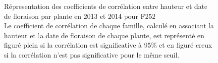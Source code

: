 \documentclass[12pt,a4paper]{article}
\begin{document}
			 				\begin{figure} [!h]
			 					\caption{Répresentation des coefficients de corrélation entre hauteur et date de floraison par plante en 2013 et 2014 pour F252\\
			 					Le coefficient de corrélation de chaque famille, calculé en associant la hauteur et la date de floraison de chaque plante, est représenté en figuré plein si la corrélation est significative à 95\% et en figuré creux si la corrélation n'est pas significative pour le même seuil.
			 					\label{correlf252}}
			 				\end{figure}
\end{document}
